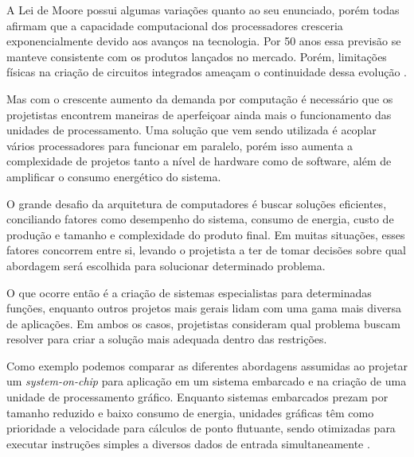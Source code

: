 \label{Introducao}



A Lei de Moore possui algumas variações quanto ao seu enunciado, porém todas afirmam que a capacidade computacional dos processadores cresceria exponencialmente devido aos avanços na tecnologia. Por 50 anos essa previsão se manteve consistente com os produtos lançados no mercado. Porém, limitações físicas na criação de circuitos integrados ameaçam o continuidade dessa evolução \cite{mack2011fifty}. 

Mas com o crescente aumento da demanda por computação é necessário que os projetistas encontrem maneiras de aperfeiçoar ainda mais o funcionamento das unidades de processamento. Uma solução que vem sendo utilizada é acoplar vários processadores para funcionar em paralelo, porém isso aumenta a complexidade de projetos tanto a nível de hardware como de software, além de amplificar o consumo energético do sistema.

O grande desafio da arquitetura de computadores é buscar soluções eficientes, conciliando fatores como desempenho do sistema, consumo de energia, custo de produção e tamanho e complexidade do produto final. Em muitas situações, esses fatores concorrem entre si, levando o projetista a ter de tomar decisões sobre qual abordagem será escolhida para solucionar determinado problema.

O que ocorre então é a criação de sistemas especialistas para determinadas funções, enquanto outros projetos mais gerais lidam com uma gama mais diversa de aplicações. Em ambos os casos, projetistas consideram qual problema buscam resolver para criar a solução mais adequada dentro das restrições. 

Como exemplo podemos comparar as diferentes abordagens assumidas ao projetar um \textit{system-on-chip} para aplicação em um sistema embarcado e na criação de uma unidade de processamento gráfico. Enquanto sistemas embarcados prezam por tamanho reduzido e baixo consumo de energia, unidades gráficas têm como prioridade a velocidade para cálculos de ponto flutuante, sendo otimizadas para executar instruções simples a diversos dados de entrada simultaneamente \cite{tanenbaum2009organizacao}. 


